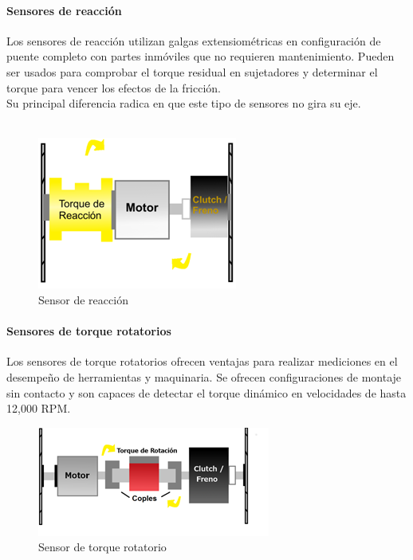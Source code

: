 \documentclass[12pt,titlepage]{article}
\begin{document}
\paragraph{Sensores de reacción}\leavevmode\newline
Los sensores de reacción utilizan galgas extensiométricas en configuración de puente completo con partes inmóviles que no requieren mantenimiento.  Pueden ser usados para comprobar el torque residual en sujetadores y determinar el torque para vencer los efectos de la fricción. \\[0.8mm] 
Su principal diferencia radica en que este tipo de sensores no gira su eje. \\ \\

\begin{figure}[htbp]
\hspace*{5.0cm} 
\includegraphics[scale=0.79]{reaccion_sens}
\caption{Sensor de reacción}
\end{figure}

\paragraph{Sensores de torque rotatorios}\leavevmode\newline
Los sensores de torque rotatorios ofrecen ventajas para realizar mediciones en el desempeño de herramientas y maquinaria. Se ofrecen configuraciones de montaje sin contacto y son capaces de detectar el torque dinámico en velocidades de hasta 12,000 RPM.\\[0.8mm] 

\begin{figure}[htbp]
\hspace*{4.6cm} 
\includegraphics[scale=0.89]{rotatorio}
\caption{Sensor de torque rotatorio}
\end{figure}
\newpage
\end{document}
